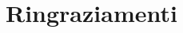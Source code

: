 \documentclass[11pt,a4paper]{book}
\begin{document}
\chapter*{Ringraziamenti}


\tableofcontents














\listoftables
\listoffigures



\printbibliography
\end{document}
